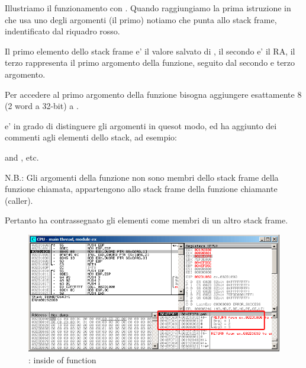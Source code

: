 \myindex{\olly}
Illustriamo il funzionamento con \olly.
Quando raggiungiamo la prima istruzione in \ttf che usa uno degli argomenti (il primo) 
notiamo che \EBP punta allo \gls{stack frame}, indentificato dal riquadro rosso.

Il primo elemento dello \gls{stack frame} e' il valore salvato di \EBP, 
il secondo e' il \ac{RA}, il terzo rappresenta il primo argomento della funzione, seguito dal secondo e terzo argomento.

Per accedere al primo argomento della funzione bisogna aggiungere esattamente 8 (2 word a 32-bit) a \EBP.

\olly e' in grado di distinguere gli argomenti in quesot modo, ed ha aggiunto dei commenti agli elementi dello stack, ad esempio:

 and , etc.

N.B.: Gli argomenti della funzione non sono membri dello stack frame della funzione chiamata, appartengono allo stack frame della
funzione chiamante (\gls{caller}).

Pertanto \olly ha contrassegnato gli elementi  come membri di un altro stack frame.

\begin{figure}[H]
\centering
\includegraphics[scale=\FigScale]{patterns/05_passing_arguments/olly.png}
\caption{\olly: inside of \ttf{} function}
\label{fig:passing_arguments_olly}
\end{figure}
